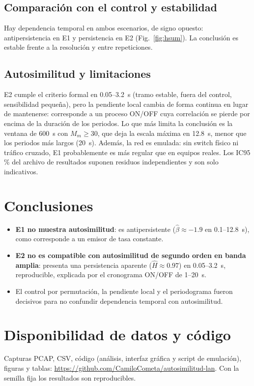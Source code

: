 \documentclass[conference,letterpaper]{IEEEtran}
\newcommand{\Hhat}{\hat{H}}
\newcommand{\bhat}{\hat{\beta}}
\begin{document}
\subsection{Comparación con el control y estabilidad}
Hay dependencia temporal en ambos escenarios, de signo opuesto: antipersistencia en E1 y persistencia en E2 (Fig.~\ref{fig:hsum}). La conclusión es estable frente a la resolución y entre repeticiones.

\subsection{Autosimilitud y limitaciones}
E2 cumple el criterio formal en 0.05--3.2~s (tramo estable, fuera del control, sensibilidad pequeña), pero la pendiente local cambia de forma continua en lugar de mantenerse: corresponde a un proceso ON/OFF cuya correlación se pierde por encima de la duración de los periodos. Lo que más limita la conclusión es la ventana de 600~s con $M_m \ge 30$, que deja la escala máxima en 12.8~s, menor que los periodos más largos (20~s). Además, la red es emulada: sin switch físico ni tráfico cruzado, E1 probablemente es más regular que en equipos reales. Los IC95\,\% del archivo de resultados suponen residuos independientes y son solo indicativos.

\section{Conclusiones}
\begin{itemize}
\item \textbf{E1 no muestra autosimilitud}: es antipersistente ($\bhat \approx -1.9$ en 0.1--12.8~s), como corresponde a un emisor de tasa constante.
\item \textbf{E2 no es compatible con autosimilitud de segundo orden en banda amplia}: presenta una persistencia aparente ($\Hhat \approx 0.97$) en 0.05--3.2~s, reproducible, explicada por el cronograma ON/OFF de 1--20~s.
\item El control por permutación, la pendiente local y el periodograma fueron decisivos para no confundir dependencia temporal con autosimilitud.
\end{itemize}

\section*{Disponibilidad de datos y código}
Capturas PCAP, CSV, código (análisis, interfaz gráfica y script de emulación), figuras y tablas: \url{https://github.com/CamiloCometa/autosimilitud-lan}. Con la semilla fija los resultados son reproducibles.
\end{document}
